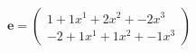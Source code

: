 \documentclass[preview]{standalone}
\begin{document}
\begin{align*}
\mathbf{e} = \begin{pmatrix}1 + 1x^{1} + 2x^{2} + -2x^{3} \\ -2 + 1x^{1} + 1x^{2} + -1x^{3}\end{pmatrix}
\end{align*}
\end{document}
